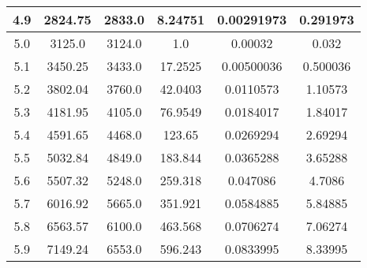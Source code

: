 \begin{table}[h!]
\begin{tabular}{|c|c|c|c|c|c|}
        4.9        & 2824.75        & 2833.0                            & 8.24751      & 0.00291973        & 0.291973          \\ \hline
        5.0        & 3125.0         & 3124.0                            & 1.0          & 0.00032           & 0.032             \\ \hline
        5.1        & 3450.25        & 3433.0                            & 17.2525      & 0.00500036        & 0.500036          \\ \hline
        5.2        & 3802.04        & 3760.0                            & 42.0403      & 0.0110573         & 1.10573           \\ \hline
        5.3        & 4181.95        & 4105.0                            & 76.9549      & 0.0184017         & 1.84017           \\ \hline
        5.4        & 4591.65        & 4468.0                            & 123.65       & 0.0269294         & 2.69294           \\ \hline
        5.5        & 5032.84        & 4849.0                            & 183.844      & 0.0365288         & 3.65288           \\ \hline
        5.6        & 5507.32        & 5248.0                            & 259.318      & 0.047086          & 4.7086            \\ \hline
        5.7        & 6016.92        & 5665.0                            & 351.921      & 0.0584885         & 5.84885           \\ \hline
        5.8        & 6563.57        & 6100.0                            & 463.568      & 0.0706274         & 7.06274           \\ \hline
        5.9        & 7149.24        & 6553.0                            & 596.243      & 0.0833995         & 8.33995           \\ \hline
    \end{tabular}\label{tab:table2}
\end{table}
